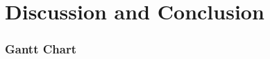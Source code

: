 \chapter{Discussion and Conclusion} \label{discussion_and_conclusion}
    \blindtext
    
        \blindtext
        
        \subsection{Gantt Chart} \label{gantt_chart}
            \blindtext
